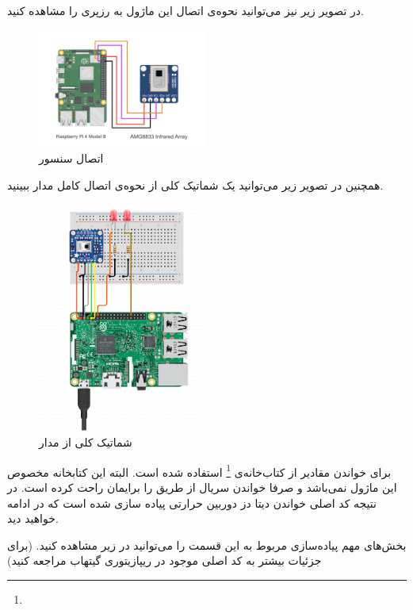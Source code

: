 در تصویر زیر نیز می‌توانید نحوه‌ی اتصال این ماژول به رزپری را مشاهده کنید.

\begin{figure}[H]
	\centering
	\includegraphics[width=0.5\textwidth]{figs/amg8833_RPi4_wiring.png}
	
	\caption{اتصال سنسور }
	\label{fig:2}
\end{figure}

همچنین در تصویر زیر می‌توانید یک شماتیک  کلی از نحوه‌ی اتصال کامل مدار ببینید.

\begin{figure}[H]
	\centering
	\includegraphics[width=0.5\textwidth]{figs/schematic-overview.jpg}
	
	\caption{شماتیک کلی از مدار}
	\label{fig:2}
\end{figure}

برای خواندن مقادیر از کتاب‌خانه‌ی 
\footnote{}
استفاده شده است. البته این کتابخانه مخصوص این ماژول نمی‌باشد و صرفا خواندن سریال از طریق  را برایمان راحت کرده است. در نتیجه کد اصلی خواندن دیتا دز دوربین حرارتی پیاده سازی شده است که در ادامه خواهید دید.

بخش‌های مهم پیاده‌سازی مربوط به این قسمت را می‌توانید در زیر مشاهده کنید. (برای جزئیات بیشتر به کد اصلی موجود در ریپازیتوری گیتهاب مراجعه کنید)

